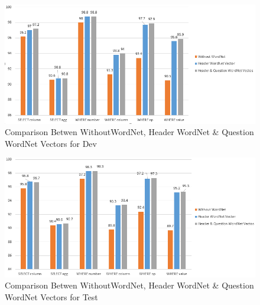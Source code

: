 \documentclass[12pt]{article}
\begin{document}
\begin{figure}[H]
    \includegraphics[width=400pt]{devset}
    \caption{Comparison Betwen WithoutWordNet, Header WordNet \&  Question WordNet Vectors for Dev}
    \label{devset}
\end{figure}


\begin{figure}[H]
    \includegraphics[width=400pt]{testset}
    \caption{Comparison Betwen WithoutWordNet, Header WordNet \&  Question WordNet Vectors for Test}
    \label{testset}
\end{figure}



\end{document}
